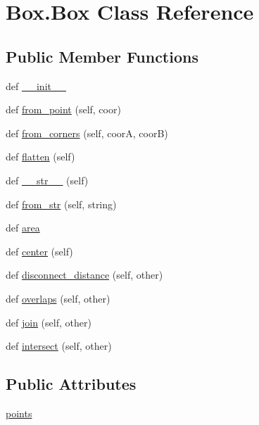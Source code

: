 \hypertarget{class_box_1_1_box}{}\section{Box.\+Box Class Reference}
\label{class_box_1_1_box}
\subsection*{Public Member Functions}
\begin{DoxyCompactItemize}
\item 
def \hyperlink{class_box_1_1_box_a0c6c84f944980cc7c4d6fb1a36f22370}{\+\_\+\+\_\+init\+\_\+\+\_\+}
\item 
def \hyperlink{class_box_1_1_box_a8c2e1615799846c33e797846e84a31d9}{from\+\_\+point} (self, coor)
\item 
def \hyperlink{class_box_1_1_box_a126dd9ab472caeda0a82878791c51468}{from\+\_\+corners} (self, coor\+A, coor\+B)
\item 
def \hyperlink{class_box_1_1_box_ad13b3450cc0ee0bb9f1e8ac20ea3d3a9}{flatten} (self)
\item 
def \hyperlink{class_box_1_1_box_a99e2532e768707b64c564f52b4400a4c}{\+\_\+\+\_\+str\+\_\+\+\_\+} (self)
\item 
def \hyperlink{class_box_1_1_box_ab7669b059a9c1a31a331c1e8525b7ab0}{from\+\_\+str} (self, string)
\item 
def \hyperlink{class_box_1_1_box_ac07faa37e0598785f23f3d84d2a930a2}{area}
\item 
def \hyperlink{class_box_1_1_box_aeae78b7e23d54f2db10f582fc27b5093}{center} (self)
\item 
def \hyperlink{class_box_1_1_box_a62588e7184b6ed99fa718c7d842c29f3}{disconnect\+\_\+distance} (self, other)
\item 
def \hyperlink{class_box_1_1_box_a45d8da7950a3b71dedae12243611a2c8}{overlaps} (self, other)
\item 
def \hyperlink{class_box_1_1_box_ab887d2cdddb1086cb97b30fb70bc8b10}{join} (self, other)
\item 
def \hyperlink{class_box_1_1_box_a11b86f3c196ff6dc388894a238344d4e}{intersect} (self, other)
\end{DoxyCompactItemize}
\subsection*{Public Attributes}
\begin{DoxyCompactItemize}
\item 
\hyperlink{class_box_1_1_box_a0fbd89c184de31490bcc33bba339064b}{points}
\end{DoxyCompactItemize}


